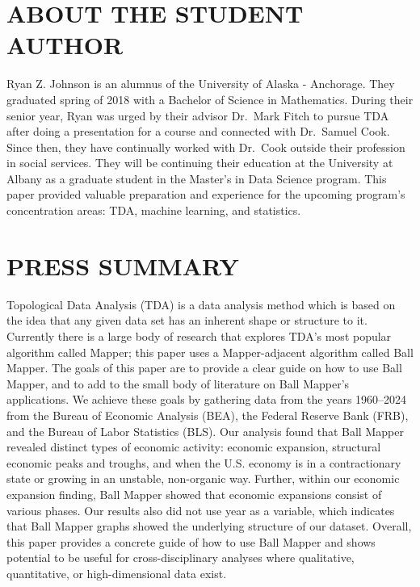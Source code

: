 \documentclass[
  10pt,
  letterpaper,
  DIV=11,
  numbers=noendperiod]{scrartcl}
\begin{document}
\section{ABOUT THE STUDENT AUTHOR}\label{about-the-student-author}

Ryan Z. Johnson is an alumnus of the University of Alaska - Anchorage.
They graduated spring of 2018 with a Bachelor of Science in Mathematics.
During their senior year, Ryan was urged by their advisor Dr.~Mark Fitch
to pursue TDA after doing a presentation for a course and connected with
Dr.~Samuel Cook. Since then, they have continually worked with Dr.~Cook
outside their profession in social services. They will be continuing
their education at the University at Albany as a graduate student in the
Master's in Data Science program. This paper provided valuable
preparation and experience for the upcoming program's concentration
areas: TDA, machine learning, and statistics.

\section{PRESS SUMMARY}\label{press-summary}

Topological Data Analysis (TDA) is a data analysis method which is based
on the idea that any given data set has an inherent shape or structure
to it. Currently there is a large body of research that explores TDA's
most popular algorithm called Mapper; this paper uses a Mapper-adjacent
algorithm called Ball Mapper. The goals of this paper are to provide a
clear guide on how to use Ball Mapper, and to add to the small body of
literature on Ball Mapper's applications. We achieve these goals by
gathering data from the years 1960--2024 from the Bureau of Economic
Analysis (BEA), the Federal Reserve Bank (FRB), and the Bureau of Labor
Statistics (BLS). Our analysis found that Ball Mapper revealed distinct
types of economic activity: economic expansion, structural economic
peaks and troughs, and when the U.S. economy is in a contractionary
state or growing in an unstable, non-organic way. Further, within our
economic expansion finding, Ball Mapper showed that economic expansions
consist of various phases. Our results also did not use year as a
variable, which indicates that Ball Mapper graphs showed the underlying
structure of our dataset. Overall, this paper provides a concrete guide
of how to use Ball Mapper and shows potential to be useful for
cross-disciplinary analyses where qualitative, quantitative, or
high-dimensional data exist.
\end{document}
